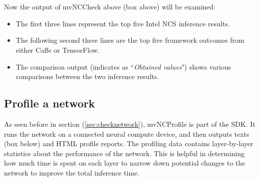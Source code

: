 \begin{mycolorbox}[colback=light-gray]
	{\tiny\texttt{}}
\end{mycolorbox}
%
\\\\Now the output of mvNCCheck above (box above) will be examined:
\begin{itemize}
\item The first three lines represent the top five Intel NCS inference results. 
\item The following second three lines are the top five framework outcomes from 
either Caffe or TensorFlow.
\item The comparison output (indicates as ``\emph{Obtained values}") shows 
various comparisons between the two inference results.
\end{itemize}
%
\subsection{Profile a network}
As seen before in section (\ref{sec:checknetwork}), mvNCProfile is part of the 
SDK. It runs the network on a connected neural 
compute device, and then outputs texts (box below) and HTML profile reports.
The profiling data contains layer-by-layer statistics about the performance of 
the network. 
This is helpful in determining how much time is spent on each layer to narrow 
down potential changes to the network to improve the total inference time.\\\\
{\tiny\texttt{}}
%
